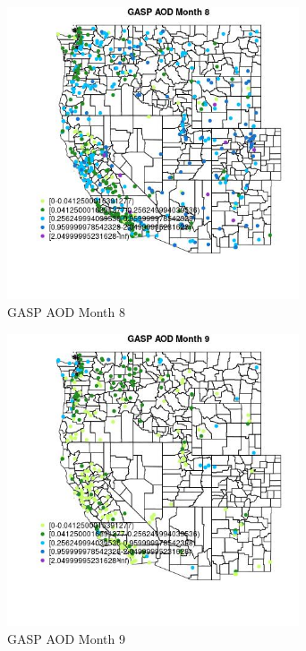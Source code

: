 \begin{figure} 
\centering  
\includegraphics[width=0.77\textwidth]{Code_Outputs/Report_ML_input_PM25_Step4_part_e_de_duplicated_aves_compiled_2019-05-18wNAs_MapObsMo8GASP_AOD.jpg} 
\caption{\label{fig:Report_ML_input_PM25_Step4_part_e_de_duplicated_aves_compiled_2019-05-18wNAsMapObsMo8GASP_AOD}GASP AOD Month 8} 
\end{figure} 
 

\begin{figure} 
\centering  
\includegraphics[width=0.77\textwidth]{Code_Outputs/Report_ML_input_PM25_Step4_part_e_de_duplicated_aves_compiled_2019-05-18wNAs_MapObsMo9GASP_AOD.jpg} 
\caption{\label{fig:Report_ML_input_PM25_Step4_part_e_de_duplicated_aves_compiled_2019-05-18wNAsMapObsMo9GASP_AOD}GASP AOD Month 9} 
\end{figure} 
 

